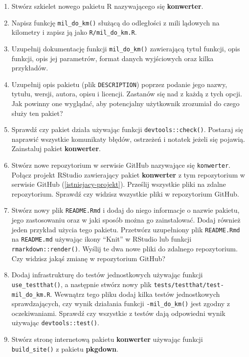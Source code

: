 \documentclass[paper=6in:9in,pagesize=pdftex,headinclude=on,footinclude=on,10pt]{scrbook}
\begin{document}
\begin{enumerate}
\def\labelenumi{\arabic{enumi})}
\item
  Stwórz szkielet nowego pakietu R nazywającego się \textbf{konwerter}.
\item
  Napisz funkcję \texttt{mil\_do\_km()} służącą do odległości z mili lądowych na kilometry i zapisz ją jako \texttt{R/mil\_do\_km.R}.
\item
  Uzupełnij dokumentację funkcji \texttt{mil\_do\_km()} zawierającą tytuł funkcji, opis funkcji, opis jej parametrów, format danych wyjściowych oraz kilka przykładów.
\item
  Uzupełnij opis pakietu (plik \texttt{DESCRIPTION}) poprzez podanie jego nazwy, tytułu, wersji, autora, opisu i licencji.
  Zastanów się nad z każdą z tych opcji.
  Jak powinny one wyglądać, aby potencjalny użytkownik zrozumiał do czego służy ten pakiet?
\item
  Sprawdź czy pakiet działa używając funkcji \texttt{devtools::check()}.
  Postaraj się naprawić wszystkie komunikaty błędów, ostrzeżeń i notatek jeżeli się pojawią.
  Zainstaluj pakiet \textbf{konwerter}.
\item
  Stwórz nowe repozytorium w serwisie GitHub nazywające się \texttt{konwerter}.
  Połącz projekt RStudio zawierający pakiet \textbf{konwerter} z tym repozytorium w serwisie GitHub (\ref{istniejacy-projekt}).
  Prześlij wszystkie pliki na zdalne repozytorium.
  Sprawdź czy widzisz wszystkie pliki w repozytorium GitHub.
\item
  Stwórz nowy plik \texttt{README.Rmd} i dodaj do niego informacje o nazwie pakietu, jego zastosowaniu oraz w jaki sposób można go zainstalować.
  Dodaj również jeden przykład użycia tego pakietu.
  Przetwórz uzupełniony plik \texttt{README.Rmd} na \texttt{README.md} używając ikony ``Knit'' w RStudio lub funkcji \texttt{rmarkdown::render()}.
  Wyślij te dwa nowe pliki do zdalnego repozytorium.
  Czy widzisz jakąś zmianę w repozytorium GitHub?
\item
  Dodaj infrastrukturę do testów jednostkowych używając funkcji \texttt{use\_testthat()}, a następnie stwórz nowy plik \texttt{tests/testthat/test-mil\_do\_km.R}.
  Wewnątrz tego pliku dodaj kilka testów jednostkowych sprawdzających, czy wynik działania funkcji \texttt{-mil\_do\_km()} jest zgodny z oczekiwaniami.
  Sprawdź czy wszystkie z testów dają odpowiedni wynik używając \texttt{devtools::test()}.
\item
  Stwórz stronę internetową pakietu \textbf{konwerter} używając funkcji \texttt{build\_site()} z pakietu \textbf{pkgdown}.

\end{enumerate}
\end{document}
